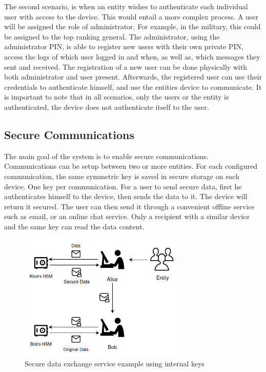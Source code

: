 The second scenario, is when an entity wishes to authenticate each individual user with access to the device. 
This would entail a more complex process. A user will be assigned the role of administrator. For example, in the military, this could be assigned to the top ranking general. The administrator, using the administrator \ac{PIN}, is able to register new users with their own private \ac{PIN}, access the logs of which user logged in and when, as well as, which messages they sent and received.
The registration of a new user can be done physically with both administrator and user present. Afterwards, the registered user can use their credentials to authenticate himself, and use the entities device to communicate.
It is important to note that in all scenarios, only the users or the entity is authenticated, the device does not authenticate itself to the user.

\subsection{Secure Communications}\label{chap:problem:scenarios:comms}

The main goal of the system is to enable secure communications. Communications can be setup between two or more entities. For each configured communication, the same symmetric key is saved in secure storage on each device. One key per communication.
For a user to send secure data, first he authenticates himself to the device, then sends the data to it. The device will return it secured. The user can then send it through a convenient offline service such as email, or an online chat service. Only a recipient with a similar device and the same key can read the data content.

\begin{figure}[h!]
    \centering
    \includegraphics[width=0.7\textwidth]{./Images/user-data-service.png}
    \caption{Secure data exchange service example using internal keys}
    \label{fig:user:data-service}
\end{figure}

